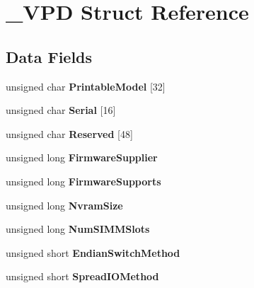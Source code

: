 \hypertarget{struct__VPD}{}\section{\+\_\+\+V\+PD Struct Reference}
\label{struct__VPD}
\subsection*{Data Fields}
\begin{DoxyCompactItemize}
\item 
\mbox{\label{struct__VPD_ae2960c49e570c3b947c0c2de88bf5e52}} 
unsigned char {\bfseries Printable\+Model} \mbox{[}32\mbox{]}
\item 
\mbox{\label{struct__VPD_addd5917d65ea9abe2b0e973add7ffe50}} 
unsigned char {\bfseries Serial} \mbox{[}16\mbox{]}
\item 
\mbox{\label{struct__VPD_ab8fc8d2fbc43f2cc7828fe660501c70a}} 
unsigned char {\bfseries Reserved} \mbox{[}48\mbox{]}
\item 
\mbox{\label{struct__VPD_a9e5fb4c1eca4af2b5b032ad3757beb4a}} 
unsigned long {\bfseries Firmware\+Supplier}
\item 
\mbox{\label{struct__VPD_af65c1831bc0a495cb6420f4b6f192ffc}} 
unsigned long {\bfseries Firmware\+Supports}
\item 
\mbox{\label{struct__VPD_add5f4e4c05d3ee9f3d40eccac47cd11b}} 
unsigned long {\bfseries Nvram\+Size}
\item 
\mbox{\label{struct__VPD_ac8a029ca10ee84f852b61d14434aafe8}} 
unsigned long {\bfseries Num\+S\+I\+M\+M\+Slots}
\item 
\mbox{\label{struct__VPD_a1b8c1e6c6e63047d329c1dc1b9f709c0}} 
unsigned short {\bfseries Endian\+Switch\+Method}
\item 
\mbox{\label{struct__VPD_a417721e3787adf8fe526dbe62bb8d8bd}} 
unsigned short {\bfseries Spread\+I\+O\+Method}
\item 
\mbox{\label{struct__VPD_a8f9fc89c0f8f3d98a4efe51853c44e8a}} 

\end{DoxyCompactItemize}
